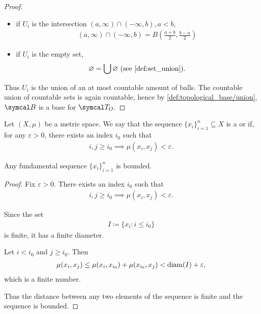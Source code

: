 \begin{proof}
\begin{itemize}
    \item if \( U_i \) is the intersection \( (a, \infty) \cap (-\infty, b), a < b \),
    \begin{align*}
      (a, \infty) \cap (-\infty, b) = B(\tfrac {a + b} 2, \tfrac {b - a} 2)
    \end{align*}

    \item if \( U_i \) is the empty set,
    \begin{align*}
      \varnothing = \bigcup \varnothing \text{ (see \cref{def:set_union})}.
    \end{align*}
  \end{itemize}

  Thus \( U_i \) is the union of an at most countable amount of balls. The countable union of countable sets is again countable, hence by \cref{def:topological_base/union}, \( \Cal{B} \) is a base for \( \Cal{T}_O \).
\end{proof}

\begin{definition}\label{def:fundamental_sequence}
  Let \( (X, \mu) \) be a metric space. We say that the sequence \( \{ x_i \}_{i=1}^n \subseteq X \) is a  or  if, for any \( \varepsilon > 0 \), there exists an index \( i_0 \) such that
  \begin{align*}
    i, j \geq i_0 \implies \mu(x_i, x_j) < \varepsilon.
  \end{align*}
\end{definition}

\begin{proposition}\label{thm:fundamental_sequence_is_bounded}
  Any fundamental sequence \( \{ x_i \}_{i=1}^n \) is bounded.
\end{proposition}
\begin{proof}
  Fix \( \varepsilon > 0 \). There exists an index \( i_0 \) such that
  \begin{align*}
    i, j \geq i_0 \implies \mu(x_i, x_j) < \varepsilon.
  \end{align*}

  Since the set
  \begin{align*}
    I \coloneqq \{ x_i \colon i \leq i_0 \}
  \end{align*}
  is finite, it has a finite diameter.

  Let \( i < i_0 \) and \( j \geq i_0 \). Then
  \begin{align*}
    \mu(x_i, x_j) \leq \mu(x_i, x_{i_0}) + \mu(x_{i_0}, x_j) < \operatorname{diam}(I) + \varepsilon,
  \end{align*}
  which is a finite number.

  Thus the distance between any two elements of the sequence is finite and the sequence is bounded.
\end{proof}


